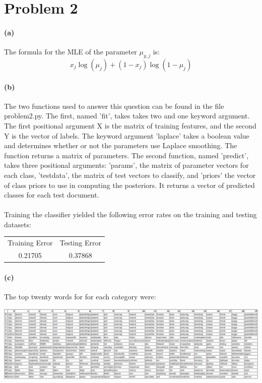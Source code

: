 \documentclass[12pt]{article}
\begin{document}
\section{Problem 2}
\paragraph{(a)} The formula for the MLE of the parameter $\mu_{y,j}$ is:
$$ x_j\log(\mu_j) + (1-x_j)\log(1-\mu_j) $$

\paragraph{(b)} The two functions used to answer this question can be found in the file problem2.py.  The first, named 'fit', takes takes two and one keyword argument.  The first positional argument X is the matrix of training features, and the second Y is the vector of labels.  The keyword argument 'laplace' takes a boolean value and determines whether or not the parameters use Laplace smoothing.  The function returns a matrix of parameters.  The second function, named 'predict', takes three positional arguments: 'params', the matrix of parameter vectors for each class, 'testdata', the matrix of test vectors to classify, and 'priors' the vector of class priors to use in computing the posteriors.  It returns a vector of predicted classes for each test document.

\paragraph{} Training the classifier yielded the following error rates on the training and testing datasets:

\begin{center}
\begin{tabular}{  c  c } 
Training Error & Testing Error \\
0.21705 & 0.37868 \\ 
\end{tabular}
\end{center}

\paragraph{(c)} The top twenty words for for each category were:

\begin{center}
\includegraphics[scale=.25]{images/alphas}
\end{center}
\end{document}
